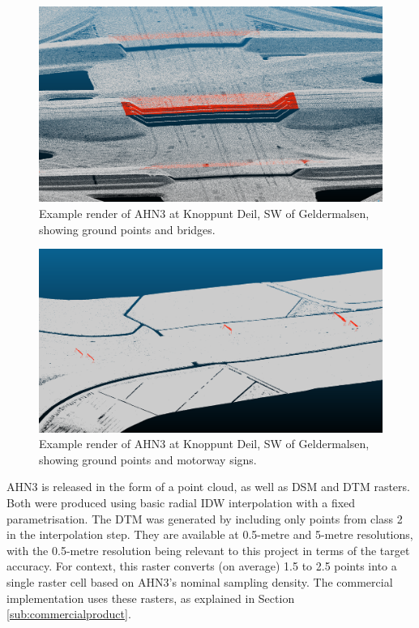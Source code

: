 \begin{figure}
    \centering
    \includegraphics[width=\linewidth]{final_report/figs/ahn_sample_01.png} 
    \caption{Example render of AHN3 at Knoppunt Deil, SW of Geldermalsen, showing ground points and bridges.}
    \label{fig:ahnbridges}
\end{figure}

\begin{figure}
    \centering
    \includegraphics[width=\linewidth]{final_report/figs/ahn_sample_02.png} 
    \caption{Example render of AHN3 at Knoppunt Deil, SW of Geldermalsen, showing ground points and motorway signs.}
    \label{fig:ahnsigns}
\end{figure}

AHN3 is released in the form of a point cloud, as well as DSM and DTM rasters. Both were produced using basic radial IDW interpolation with a fixed parametrisation. The DTM was generated by including only points from class 2 in the interpolation step. They are available at 0.5-metre and 5-metre resolutions, with the 0.5-metre resolution being relevant to this project in terms of the target accuracy. For context, this raster converts (on average) 1.5 to 2.5 points into a single raster cell based on AHN3's nominal sampling density. The commercial implementation uses these rasters, as explained in Section \ref{sub:commercialproduct}.

